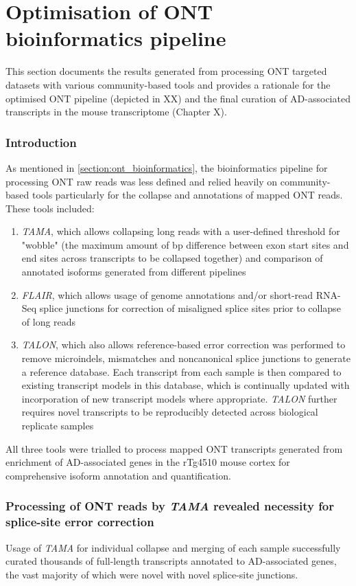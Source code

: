 \chapter{Optimisation of ONT bioinformatics pipeline}\label{app_ONTBioinformatics}
\label{ONT_Bioinformatics_appendix}

\stoptocwriting
This section documents the results generated from processing ONT targeted datasets with various community-based tools and provides a rationale for the optimised ONT pipeline (depicted in XX) and the final curation of AD-associated transcripts in the mouse transcriptome (Chapter X). 

\subsection{Introduction}
As mentioned in \cref{section:ont_bioinformatics}, the bioinformatics pipeline for processing ONT raw reads was less defined and relied heavily on community-based tools particularly for the collapse and annotations of mapped ONT reads. These tools included:
\begin{enumerate}
	\item \textit{TAMA}, which allows collapsing long reads with a user-defined threshold for "wobble" (the maximum amount of bp difference between exon start sites and end sites across transcripts to be collapsed together) and comparison of annotated isoforms generated from different pipelines
	\item \textit{FLAIR}, which allows usage of genome annotations and/or short-read RNA-Seq splice junctions for correction of misaligned splice sites prior to collapse of long reads  
	\item \textit{TALON}, which also allows reference-based error correction was performed to remove microindels, mismatches and noncanonical splice junctions to generate a reference database. Each transcript from each sample is then compared to existing transcript models in this database, which is continually updated with incorporation of new transcript models where appropriate. \textit{TALON} further requires novel transcripts to be reproducibly detected across biological replicate samples 
\end{enumerate}
All three tools were trialled to process mapped ONT transcripts generated from enrichment of AD-associated genes in the rTg4510 mouse cortex for comprehensive isoform annotation and quantification. 

\subsection{Processing of ONT reads by \textit{TAMA} revealed necessity for splice-site error correction}
Usage of \textit{TAMA} for individual collapse and merging of each sample successfully curated thousands of full-length transcripts annotated to AD-associated genes, the vast majority of which were novel with novel splice-site junctions. 

